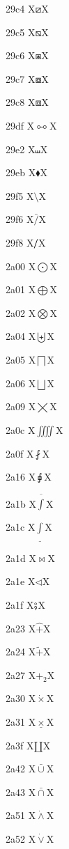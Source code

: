 \documentclass[11pt]{article}
\begin{document}
29c4 X{\ensuremath{\boxslash}}X

29c5 X{\ensuremath{\boxbslash}}X

29c6 X{\ensuremath{\boxast}}X

29c7 X{\ensuremath{\boxcircle}}X

29c8 X{\ensuremath{\boxbox}}X

29df X{\ensuremath{\multimapboth}}X

29e2 X{\ensuremath{\shuffle}}X

29eb X{\ensuremath{\blacklozenge}}X

29f5 X{\ensuremath{\setminus}}X

29f6 X{\ensuremath{\bar{/}}}X

29f8 X{\ensuremath{\big{/}}}X

2a00 X{\ensuremath{\bigodot}}X

2a01 X{\ensuremath{\bigoplus}}X

2a02 X{\ensuremath{\bigotimes}}X

2a04 X{\ensuremath{\biguplus}}X

2a05 X{\ensuremath{\bigsqcap}}X

2a06 X{\ensuremath{\bigsqcup}}X

2a09 X{\ensuremath{\varprod}}X

2a0c X{\ensuremath{\iiiint}}X

2a0f X{\ensuremath{\fint}}X

2a16 X{\ensuremath{\sqint}}X

2a1b X{\ensuremath{\overline{\int}}}X

2a1c X{\ensuremath{\underline{\int}}}X

2a1d X{\ensuremath{\Join}}X

2a1e X{\ensuremath{\lhd}}X

2a1f X{\ensuremath{\fatsemi}}X

2a23 X{\ensuremath{\hat{+}}}X

2a24 X{\ensuremath{\tilde{+}}}X

2a27 X{\ensuremath{+_2}}X

2a30 X{\ensuremath{\dot{\times}}}X

2a31 X{\ensuremath{\underline{\times}}}X

2a3f X{\ensuremath{\amalg}}X

2a42 X{\ensuremath{\bar{\cup}}}X

2a43 X{\ensuremath{\bar{\cap}}}X

2a51 X{\ensuremath{\dot{\wedge}}}X

2a52 X{\ensuremath{\dot{\vee}}}X
\end{document}
